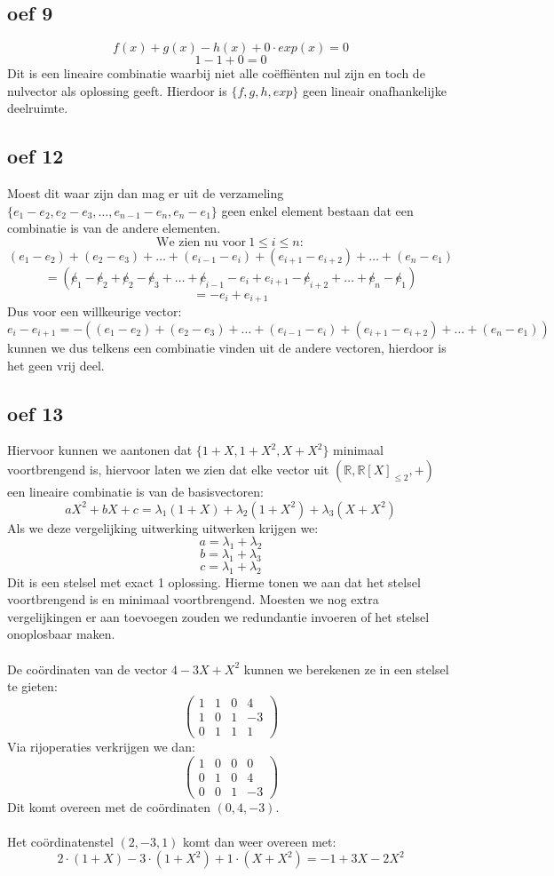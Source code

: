 \documentclass[lineaire_algebra_oplossingen.tex]{subfiles}
\begin{document}
\subsection*{oef 9}
$$f(x)+g(x)-h(x)+0\cdot exp(x) = 0$$
$$1 - 1 + 0 = 0$$
Dit is een lineaire combinatie waarbij niet alle co\"effi\"enten nul zijn en toch de nulvector als oplossing geeft. Hierdoor is
$\{f,g,h,exp\}$ geen lineair onafhankelijke deelruimte.
\subsection*{oef 12}
Moest dit waar zijn dan mag er uit de verzameling $\{ e_1-e_2,e_2-e_3,\dots ,e_{n-1}-e_n,e_n-e_1\}$ geen enkel element bestaan dat een combinatie is van de andere elementen.
$$
\text{We zien nu voor}\ 1 \leq i \leq n:
$$
$$ 
(e_1-e_2)+(e_2-e_3)+\dots +(e_{i-1}-e_i)+(e_{i+1}-e_{i+2})+\dots + (e_n - e_1)
$$
$$
= (\not e_1-\not e_2+\not e_2-\not e_3+\dots +\not e_{i-1}-e_i+e_{i+1}-\not e_{i+2}+\dots + \not e_n - \not e_1)
$$
$$
= -e_i + e_{i+1}
$$
Dus voor een willkeurige vector:
$$
e_i - e_{i+1} = -\left((e_1-e_2)+(e_2-e_3)+\dots +(e_{i-1}-e_i)+(e_{i+1}-e_{i+2})+\dots + (e_n - e_1)\right)
$$
kunnen we dus telkens een combinatie vinden uit de andere vectoren, hierdoor is het geen vrij deel. 
\subsection*{oef 13}
Hiervoor kunnen we aantonen dat $\{1+X,1+X^2,X+X^2\}$ minimaal voortbrengend is, hiervoor laten we zien dat elke vector uit  $(\mathbb{R},\mathbb{R}[X]_{\leq 2},+)$ een lineaire combinatie is van de basisvectoren:
$$aX^2 + bX + c = \lambda_{1} (1+X) + \lambda_{2} (1+X^2) + \lambda_{3} (X+X^2)$$
Als we deze vergelijking uitwerking uitwerken krijgen we:
$$a = \lambda_{1} + \lambda_2$$
$$b = \lambda_1 + \lambda_3$$
$$c = \lambda_1 + \lambda_2$$
Dit is een stelsel met exact 1 oplossing. Hierme tonen we aan dat het stelsel voortbrengend is en minimaal voortbrengend. Moesten we nog extra vergelijkingen er aan toevoegen zouden we redundantie invoeren of het stelsel onoplosbaar maken.
\\
\\
De co\"ordinaten van de vector $4 -3X + X^2$ kunnen we berekenen ze in een stelsel te gieten:
$$
\begin{pmatrix}
1&1&0&4\\
1&0&1&-3\\
0&1&1&1
\end{pmatrix}
$$
Via rijoperaties verkrijgen we dan:
$$
\begin{pmatrix}
1&0&0&0\\
0&1&0&4\\
0&0&1&-3
\end{pmatrix}
$$
Dit komt overeen met de co\"ordinaten $(0,4,-3)$.
\\
\\
Het co\"ordinatenstel $(2,-3,1)$ komt dan weer overeen met:
$$
2\cdot (1+X) -3 \cdot (1+X^2)+ 1\cdot (X+X^2)= -1 +3X-2X^2
$$
\end{document}
